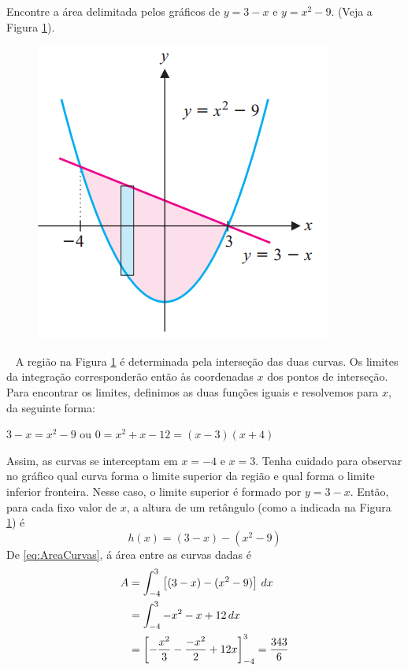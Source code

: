 \cleardoublepage\documentclass[../main.tex]{subfiles}
\begin{document}
\begin{ex}
Encontre a área delimitada pelos gráficos de $y = 3 - x$ e $y = x^2 - 9$. (Veja a Figura \ref{fig:AreaEntreCurvasEx2}).\\
\begin{figure}[h!tb]
    \centering
    \includegraphics[scale=0.75]{figs/AreaEntcurvas/AreaEntreCurvasEx}
    \caption{}
    \label{fig:AreaEntreCurvasEx2}
\end{figure}
\begin{solut}~
A região na Figura \ref{fig:AreaEntreCurvasEx2} é determinada pela interseção das duas curvas. Os limites da integração corresponderão então às coordenadas $x$ dos pontos de interseção. Para encontrar os limites, definimos as duas funções iguais e resolvemos para $x$, da seguinte forma:\\
 \centerline{$3- x = x^2 - 9$ ou $0 = x^2 + x - 12 = ( x - 3)(x + 4)$}
 
 Assim, as curvas se interceptam em $x = -4$ e $x = 3$. Tenha cuidado para observar no gráfico qual curva forma o limite superior da região e qual forma o limite inferior fronteira. Nesse caso, o limite superior é formado por $y = 3 - x$. Então, para cada fixo valor de $x$, a altura de um retângulo (como a indicada na Figura \ref{fig:AreaEntreCurvasEx2}) é
$$h ( x ) = (3 - x ) - ( x^2 - 9)$$
De \ref{eq:AreaCurvas},  á área entre as curvas dadas é
\begin{align*}
  A&=\intdef{-4}{3}{\pr{(3-x)-(x^2-9)}}\\
  & = \intdef{-4}{3}{-x^2-x+12}\\
  &=\pr{-\frac{x^2}{3}-\frac{-x^2}{2}+12x}_{-4}^3=\frac{343}{6}%
\end{align*}
\end{solut}
\end{ex}
\end{document}
